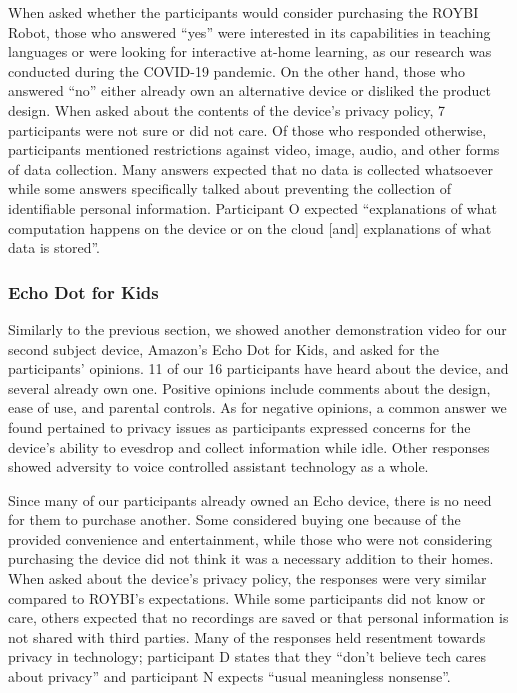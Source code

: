 \documentclass[12pt]{ucthesis}
\begin{document}
When asked whether the participants would consider purchasing the ROYBI Robot, those who answered ``yes'' were interested in its capabilities in teaching languages or were looking for interactive at-home learning, as our research was conducted during the COVID-19 pandemic. On the other hand, those who answered ``no'' either already own an alternative device or disliked the product design.
When asked about the contents of the device's privacy policy, 7 participants were not sure or did not care. Of those who responded otherwise, participants mentioned restrictions against video, image, audio, and other forms of data collection. Many answers expected that no data is collected whatsoever while some answers specifically talked about preventing the collection of identifiable personal information. Participant O expected ``explanations of what computation happens on the device or on the cloud [and] explanations of what data is stored''.

\subsubsection{Echo Dot for Kids}
Similarly to the previous section, we showed another demonstration video for our second subject device, Amazon's Echo Dot for Kids, and asked for the participants' opinions. 11 of our 16 participants have heard about the device, and several already own one. Positive opinions include comments about the design, ease of use, and parental controls. As for negative opinions, a common answer we found pertained to privacy issues as participants expressed concerns for the device's ability to evesdrop and collect information while idle. Other responses showed adversity to voice controlled assistant technology as a whole. 

Since many of our participants already owned an Echo device, there is no need for them to purchase another. Some considered buying one because of the provided convenience and entertainment, while those who were not considering purchasing the device did not think it was a necessary addition to their homes. When asked about the device's privacy policy, the responses were very similar compared to ROYBI's expectations. While some participants did not know or care, others expected that no recordings are saved or that personal information is not shared with third parties. Many of the responses held resentment towards privacy in technology; participant D states that they ``don't believe tech cares about privacy'' and participant N expects ``usual meaningless nonsense''.
\end{document}

